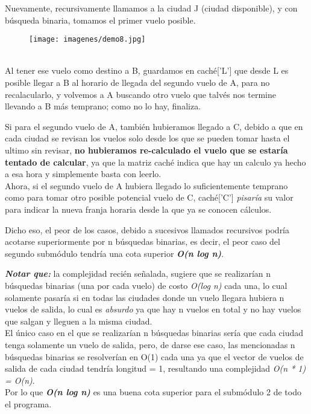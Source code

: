 Nuevamente, recursivamente llamamos a la ciudad J (ciudad disponible), y con búsqueda binaria, tomamos el primer vuelo posible.
\begin{figure}[h]
	\begin{center}
	   \texttt{[image: imagenes/demo8.jpg]}
	\end{center}
\end{figure}\\
Al tener ese vuelo como destino a B, guardamos en caché['L'] que desde L es posible llegar a B al horario de llegada del segundo vuelo de A, para no recalacularlo, y volvemos a A buscando otro vuelo que talvés nos termine llevando a B más temprano; como no lo hay, finaliza.

Si para el segundo vuelo de A, también hubieramos llegado a C, debido a que en cada ciudad se revisan los vuelos solo desde los que se pueden tomar hasta el ultimo sin revisar, \textbf{no hubieramos re-calculado el vuelo que se estaría tentado de calcular}, ya que la matriz caché indica que hay un calculo ya hecho a esa hora y simplemente basta con leerlo.\\
Ahora, si el segundo vuelo de A hubiera llegado lo suficientemente temprano como para tomar otro posible potencial vuelo de C,     caché['C'] \textit{pisaría} su valor para indicar la nueva franja horaria desde la que ya se conocen cálculos. 

Dicho eso, el peor de los casos, debido a sucesivos llamados recursivos podría acotarse superiormente por n búsquedas binarias, es decir, el peor caso del segundo submódulo tendría una cota superior \textbf{\textit{ O(n log n)}}.

\textit{\textbf{Notar que:}} la complejidad recién señalada, sugiere que se realizarían n búsquedas binarias (una por cada vuelo) de costo \textit{O(log n)} cada una, lo cual solamente pasaría si en todas las ciudades donde un vuelo llegara hubiera n vuelos de salida, lo cual es \textit{absurdo} ya que hay n vuelos en total y no hay vuelos que salgan y lleguen a la misma ciudad.\\
El único caso en el que se realizarían n búsquedas binarias sería que cada ciudad tenga solamente un vuelo de salida, pero, de darse ese caso, las mencionadas n búsquedas binarias se resolverían en O(1) cada una ya que el vector de vuelos de salida de cada ciudad tendría longitud = 1, resultando una complejidad \textit{O(n * 1) = O(n)}.\\
Por lo que \textit{\textbf{O(n log n)}} es una buena cota superior para el submódulo 2 de todo el programa.\\

